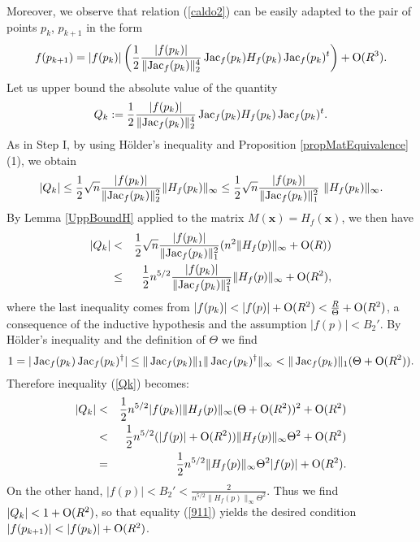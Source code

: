 \documentclass[10pt]{article}
\newcommand{\x}{{\bm x}}
\def\Jac{\mathop{\rm Jac}\nolimits}
\begin{document}
{Moreover,   
we observe that relation (\ref{caldo2}) can be easily adapted to the pair of points $p_k$, $p_{k+1}$
in the form
\begin{eqnarray}\label{911}
f(p_{k+1}) = |f(p_k)| \left ( 
\frac{1}{2} \frac{|f(p_k)|}{\|{\rm Jac}_f(p_k)\|_2^4} \Jac_f(p_k) H_f(p_k) \Jac_f(p_k)^t \right ) + {\rm O}(R^3). 
\end{eqnarray}
Let us upper bound the absolute value of the quantity
$$
Q_k:= \frac{1}{2} \frac{|f(p_k)|}{\|{\rm Jac}_f(p_k)\|_2^4} \Jac_f(p_k) H_f(p_k) \Jac_f(p_k)^t.
$$
As in Step I, by using H\"older's inequality
and Proposition \ref{propMatEquivalence}(1), we obtain
$$
|Q_k| 
\le  \frac{1}{2} \sqrt{n} \frac{|f(p_k)|}{\|{\rm Jac}_f(p_k)\|_2^2}   \|H_f(p_k)\|_\infty 
\le  \frac{1}{2}\sqrt{n}  \frac{|f(p_k)|}{\|{\rm Jac}_f(p_k)\|_1^2}  \ \|H_f(p_k)\|_\infty.
$$
By Lemma \ref{UppBoundH} applied to the matrix $M(\x) = H_f(\x)$, we then have
\begin{eqnarray}\label{Qk}
|Q_k| 
&< & \frac{1}{2}\sqrt{n}  \frac{|f(p_k)|}{\|{\rm Jac}_f(p_k)\|_1^2}  (n^2\|H_f(p)\|_\infty+{\rm O}(R)) \nonumber\\
&\le& \frac{1}{2}n^{5/2}  \frac{|f(p_k)|}{\|{\rm Jac}_f(p_k)\|_1^2}   \|H_f(p)\|_\infty+{\rm O}(R^2), 
\end{eqnarray}
where the last inequality comes from $|f(p_k)| < |f(p)| + {\rm O}(R^2) < \frac{R}{\Theta} + {\rm O}(R^2)$, 
a consequence of the inductive hypothesis and the assumption $|f(p)|<B_2'$.
By H\"older's inequality and the definition of $\Theta$ we find
$$
1= |\Jac_f(p_k) \Jac_f(p_k)^\dagger| \le \|\Jac_f(p_k)\|_1  \|\Jac_f(p_k)^\dagger\|_\infty
< \|\Jac_f(p_k)\|_1(\Theta + {\rm O}(R^2)). 
$$ 
Therefore inequality (\ref{Qk}) becomes:
\begin{eqnarray*}
|Q_k| &< & \frac{1}{2} n^{5/2} |f(p_k)| \|H_f(p)\|_\infty(\Theta+{\rm O}(R^2))^2+{\rm O}(R^2)\\
&<&  \frac{1}{2} n^{5/2} ( |f(p)| + {\rm O}(R^2)) \|H_f(p)\|_\infty \Theta^2+{\rm O}(R^2)\\
&=& \frac{1}{2} n^{5/2}  \|H_f(p)\|_\infty \Theta^2  |f(p)|+{\rm O}(R^2).
\end{eqnarray*}
On the other hand,  
$|f(p)| < B_2' < \frac{2}{n^{5/2} \|H_f(p)\|_\infty  \Theta^2}$.
Thus we  find $|Q_k|<1 + {\rm O}(R^2)$,  so that equality (\ref{911})  
yields  the desired  condition $|f(p_{k+1})| < |f(p_k)|+{\rm O}(R^2)$.
\smallskip

}
\end{document}
